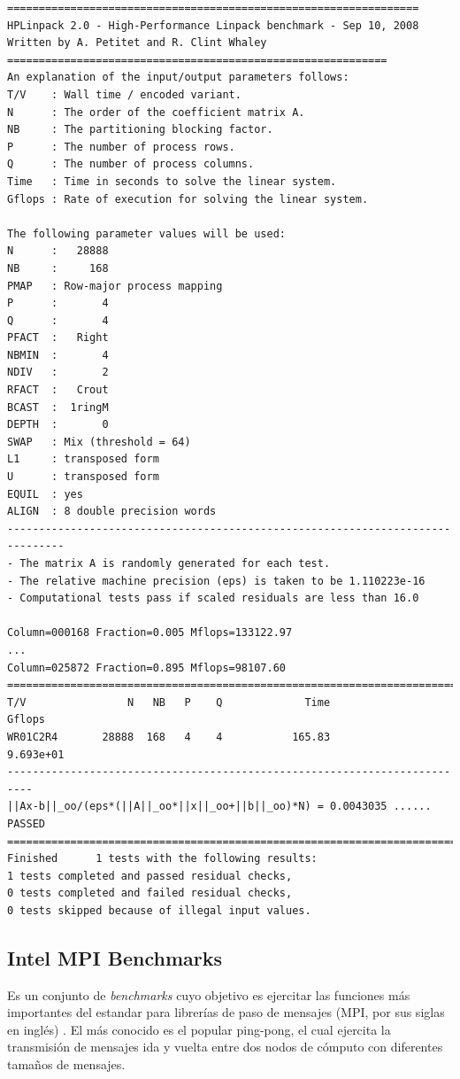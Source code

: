 \documentclass[a4paper]{report}
\begin{document}
\begin{verbatim}
=================================================================
HPLinpack 2.0 - High-Performance Linpack benchmark - Sep 10, 2008
Written by A. Petitet and R. Clint Whaley
============================================================
An explanation of the input/output parameters follows:
T/V    : Wall time / encoded variant.
N      : The order of the coefficient matrix A.
NB     : The partitioning blocking factor.
P      : The number of process rows.
Q      : The number of process columns.
Time   : Time in seconds to solve the linear system.
Gflops : Rate of execution for solving the linear system.

The following parameter values will be used:
N      :   28888
NB     :     168
PMAP   : Row-major process mapping
P      :       4
Q      :       4
PFACT  :   Right
NBMIN  :       4
NDIV   :       2
RFACT  :   Crout
BCAST  :  1ringM
DEPTH  :       0
SWAP   : Mix (threshold = 64)
L1     : transposed form
U      : transposed form
EQUIL  : yes
ALIGN  : 8 double precision words
-------------------------------------------------------------------------------
- The matrix A is randomly generated for each test.
- The relative machine precision (eps) is taken to be 1.110223e-16
- Computational tests pass if scaled residuals are less than 16.0

Column=000168 Fraction=0.005 Mflops=133122.97
...
Column=025872 Fraction=0.895 Mflops=98107.60
==========================================================================
T/V                N   NB   P    Q             Time                 Gflops
WR01C2R4       28888  168   4    4           165.83              9.693e+01
--------------------------------------------------------------------------
||Ax-b||_oo/(eps*(||A||_oo*||x||_oo+||b||_oo)*N) = 0.0043035 ...... PASSED
==========================================================================
Finished      1 tests with the following results:
1 tests completed and passed residual checks,
0 tests completed and failed residual checks,
0 tests skipped because of illegal input values.
\end{verbatim}

\subsection{Intel MPI Benchmarks}

Es un conjunto de {\it benchmarks} cuyo objetivo es ejercitar las funciones
m\'as importantes del estandar para librer\'ias de paso de mensajes (MPI, por sus siglas en ingl\'es) \cite{mpi}.
El m\'as conocido es el popular ping-pong, el cual ejercita la transmisi\'on de mensajes ida y vuelta entre dos nodos de
c\'omputo con diferentes tama\~nos de mensajes. 
\end{document}
